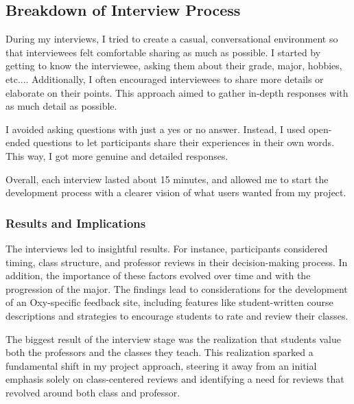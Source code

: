 \documentclass[10pt,twocolumn]{article}
\begin{document}
\subsection{Breakdown of Interview Process}

During my interviews, I tried to create a casual, conversational environment so that interviewees felt comfortable sharing as much as possible. I started by getting to know the interviewee, asking them about their grade, major, hobbies, etc.... Additionally, I often encouraged interviewees to share more details or elaborate on their points. This approach aimed to gather in-depth responses with as much detail as possible.

I avoided asking questions with just a yes or no answer. Instead, I used open-ended questions to let participants share their experiences in their own words. This way, I got more genuine and detailed responses.

Overall, each interview lasted about 15 minutes, and allowed me to start the development process with a clearer vision of what users wanted from my project.


\subsubsection{Results and Implications}

The interviews led to insightful results. For instance, participants considered timing, class structure, and professor reviews in their decision-making process. In addition, the importance of these factors evolved over time and with the progression of the major. The findings lead to considerations for the development of an Oxy-specific feedback site, including features like student-written course descriptions and strategies to encourage students to rate and review their classes.


The biggest result of the interview stage was the realization that students value both the professors and the classes they teach. This realization sparked a fundamental shift in my project approach, steering it away from an initial emphasis solely on class-centered reviews and identifying a need for reviews that revolved around both class and professor. 
\end{document}
